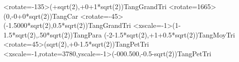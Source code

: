 \documentclass{standalone}
\begin{document}


\begin{EnvTangramTikz}
  \PieceTangram[TangSol]<rotate=-135>({+sqrt(2)},{+0+1*sqrt(2)}){TangGrandTri}
  \PieceTangram[TangSol]<rotate=1665>({0},{-0+0*sqrt(2)}){TangCar}
  \PieceTangram[TangSol]<rotate=-45>({-1.5000*sqrt(2)},{0.5*sqrt(2)}){TangGrandTri}
  \PieceTangram[TangSol]<xscale=-1>({1-1.5*sqrt(2)},{.50*sqrt(2)}){TangPara}
  \PieceTangram[TangSol]({-2-1.5*sqrt(2)},{+1+0.5*sqrt(2)}){TangMoyTri}
  \PieceTangram[TangSol]<rotate=45>({sqrt(2)},{+0-1.5*sqrt(2)}){TangPetTri}
  \PieceTangram[TangSol]<xscale=-1,rotate=3780,yscale=-1>({-000.500},{-0.5-sqrt(2)}){TangPetTri} %
\end{EnvTangramTikz}
\end{document}
